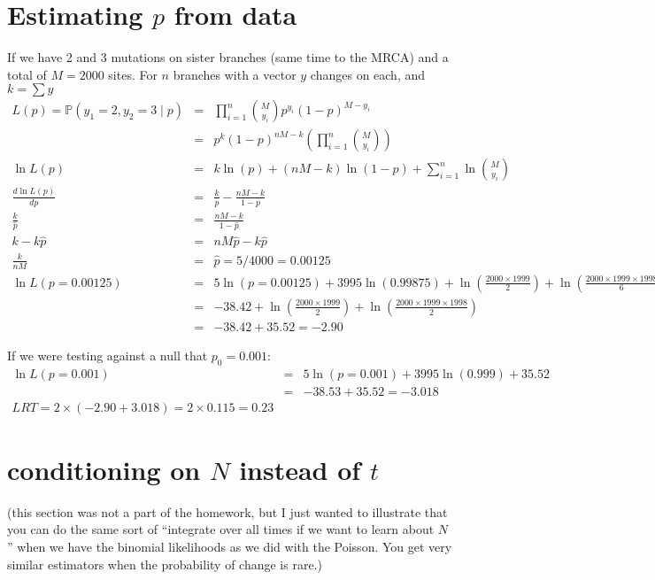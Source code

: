 \documentclass[11pt]{article}
\renewcommand{\Pr}{\mathbb{P}}
\begin{document}
\section*{Estimating $p$ from data}
If we have 2 and 3 mutations on sister branches (same time to the MRCA) and a total of 
$M=2000$ sites.
For $n$ branches with a vector $y$ changes on each, and $k= \sum y$
\begin{eqnarray*}
   L(p) =  \Pr(y_1=2, y_2=3 \mid p)
   & = & \prod_{i=1}^n {M \choose y_i} p^{y_i}(1-p)^{M-y_i} \\ 
   & = & p^{k}(1-p)^{nM-k} \left(\prod_{i=1}^n {M \choose y_i} \right)  \\ 
   \ln L(p) & = & k\ln(p) + (nM - k)\ln(1-p) + \sum_{i=1}^n \ln {M \choose y_i} \\
   \frac{d\ln L(p)}{dp} & = & \frac{k}{p} - \frac{nM - k}{1-p}\\
   \frac{k}{\hat{p}} & = & \frac{nM - k}{1-\hat{p}} \\
   k - k\hat{p} & = & nM\hat{p} - k\hat{p} \\
   \frac{k}{nM} & = & \hat{p} = 5/4000 = 0.00125 \\
   \ln L(p=0.00125) & = & 5\ln(p=0.00125) + 3995\ln(0.99875) + \ln\left({\frac{2000\times 1999}{2}}\right)+ \ln\left({\frac{2000\times 1999\times 1998}{6}}\right) \\
   & = & -38.42 + \ln\left({\frac{2000\times 1999}{2}}\right)+ \ln\left({\frac{2000\times 1999\times 1998}{2}}\right) \\
   & = & -38.42 + 35.52 = -2.90
\end{eqnarray*}

If we were testing against a null that $p_0= 0.001$:
\begin{eqnarray*}
\ln L(p=0.001) & = & 5\ln(p=0.001) + 3995\ln(0.999) + 35.52 \\
& = & -38.53 + 35.52 = - 3.018 \\
LRT = 2\times(-2.90 + 3.018) = 2\times0.115 = 0.23
\end{eqnarray*}


\section*{conditioning on $N$ instead of $t$}
(this section was not a part of the homework, but I just wanted to illustrate that you can do the 
same sort of ``integrate over all times if we want to learn about $N$'' when we
have the binomial likelihoods as we did with the Poisson.
You get very similar estimators when the probability of change is rare.)
\end{document}
